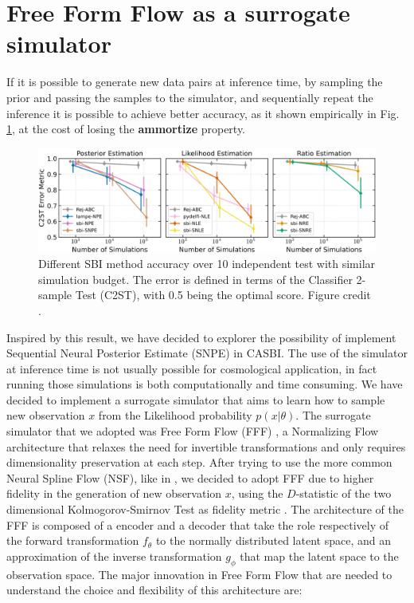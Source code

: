 \section{Free Form Flow as a surrogate simulator} \label{sec:SurrogateSimulator}
If it is possible to generate new data pairs at inference time, by sampling the prior and passing the samples to the simulator, and sequentially repeat the inference it is possible to achieve better accuracy, as it shown empirically in Fig. \ref{fig:sequential_SBI}, at the cost of losing the \textbf{ammortize} property.
\begin{figure}[H]
    \centering
    \includegraphics[width=1\textwidth]{./figure/sequential_SBI.png}
    \caption{Different SBI method accuracy over 10 independent test with similar simulation budget. The error is defined in terms of the Classifier 2-sample Test (C2ST), with 0.5 being the optimal score. Figure credit \cite{hoLtUILIAllinOneFramework2024}. }
    \label{fig:sequential_SBI}
\end{figure}

Inspired by this result, we have decided to explorer the possibility of implement Sequential Neural Posterior Estimate (SNPE) in CASBI. The use of the simulator at inference time is not usually possible for cosmological application, in fact running those simulations is both computationally and time consuming. We have decided to implement a surrogate simulator that aims to learn how to sample new observation $x$ from the Likelihood probability $p(x|\theta)$. The surrogate simulator that we adopted was Free Form Flow (FFF) \cite{draxlerFreeformFlowsMake2024}, a Normalizing Flow architecture that relaxes the need for invertible transformations and only requires dimensionality preservation at each step. After trying to use the more common Neural Spline Flow (NSF), like in \cite{wolfGalacticFlowLearningGeneralized2023}, we decided to adopt FFF due to higher fidelity in the generation of new observation $x$, using the $D$-statistic of the two dimensional Kolmogorov-Smirnov Test as fidelity metric \cite{lopesTwodimensionalKolmogorovSmirnovTest}. The architecture of the FFF is composed of a encoder and a decoder that take the role respectively of the forward transformation $f_\theta$ to the normally distributed latent space, and an approximation of the inverse transformation $g_\phi$ that map the latent space to the observation space. The major innovation in Free Form Flow that are needed to understand the choice and flexibility of this architecture are:

